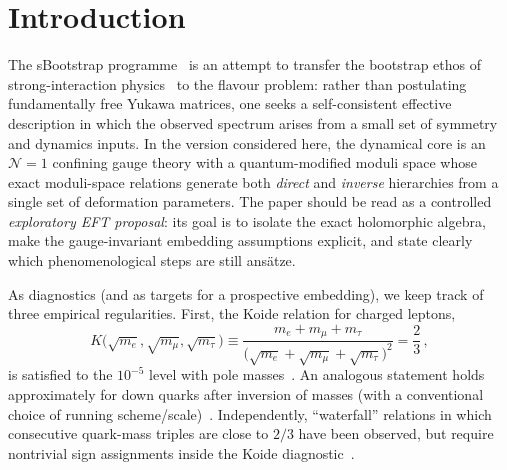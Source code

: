 \documentclass[11pt,a4paper]{article}
\begin{document}
\section{Introduction}
\label{sec:intro}

The sBootstrap programme~\cite{Rivero:2024epjc} is an attempt to transfer the
bootstrap ethos of strong-interaction physics~\cite{Chew:1962} to the flavour
problem: rather than postulating fundamentally free Yukawa matrices, one seeks
a self-consistent effective description in which the observed spectrum arises
from a small set of symmetry and dynamics inputs.  In the version considered
here, the dynamical core is an $\mathcal{N}{=}1$ confining gauge theory with a
quantum-modified moduli space
whose exact moduli-space relations generate both \emph{direct} and \emph{inverse}
hierarchies from a single set of deformation parameters.
The paper should be read as a controlled \emph{exploratory EFT proposal}:
its goal is to isolate the exact holomorphic algebra, make the gauge-invariant
embedding assumptions explicit, and state clearly which phenomenological steps
are still ans\"atze.

As diagnostics (and as targets for a prospective embedding), we keep track of
three empirical regularities.
First, the Koide relation for charged leptons,
\begin{equation}
  K\bigl(\sqrt{m_e},\sqrt{m_\mu},\sqrt{m_\tau}\bigr)
  \equiv \frac{m_e+m_\mu+m_\tau}{\bigl(\sqrt{m_e}+\sqrt{m_\mu}+\sqrt{m_\tau}\bigr)^2}
  = \frac{2}{3}\,,
  \label{eq:koide_leptons}
\end{equation}
is satisfied to the $10^{-5}$ level with pole masses~\cite{Koide:1983qe,PDG:2024}.
An analogous statement holds approximately for down quarks after inversion
of masses (with a conventional choice of running scheme/scale)~\cite{Rivero:2005}.
Independently, ``waterfall'' relations in which consecutive quark-mass
triples are close to $2/3$ have been observed, but require nontrivial sign
assignments inside the Koide diagnostic~\cite{Zenczykowski:2012}.
\end{document}
